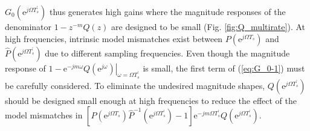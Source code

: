 \documentclass [11pt, proquest] {uwthesis}[2020/02/24]
\begin{document}
$G_{0}(\text{e}^{j\Omega T_{s}^{'}})$ thus generates high gains where
the magnitude responses of the denominator $1-z^{-m}Q(z)$ are designed
to be small (Fig. \ref{fig:Q_multirate}). At high frequencies, intrinsic
model mismatches exist between $P(\text{e}^{j\Omega T_{s}})$ and
$\hat{P}(\text{e}^{j\Omega T_{s}^{'}})$ due to different sampling
frequencies. Even though the magnitude response of $\left.1-\text{e}^{-jm\omega}Q(\text{e}^{j\omega})\right|_{\omega=\Omega T_{s}^{'}}$
is small, the first term of (\ref{eq:G_0-1}) must be carefully considered.
To eliminate the undesired magnitude shapes, $Q(\text{e}^{j\Omega T_{s}^{'}})$
should be designed small enough at high frequencies to reduce the
effect of the model mismatches in $[P(\text{e}^{j\Omega T_{s}})\hat{P}^{-1}(\text{e}^{j\Omega T_{s}^{'}})-1]\text{e}^{-jm\Omega T_{s}^{'}}Q(\text{e}^{j\Omega T_{s}^{'}})$.
\end{document}
